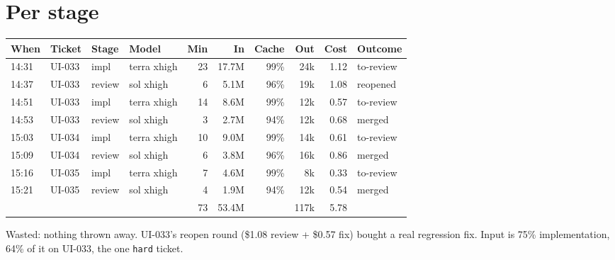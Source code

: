 \documentclass[11pt,a4paper]{article}
\begin{document}
\section*{Per stage}

{\small
\begin{tabularx}{\linewidth}{@{}llllrrrrrX@{}}
\toprule
When & Ticket & Stage & Model & Min & In & Cache & Out & Cost & Outcome \\
\midrule
14:31 & UI-033 & impl & terra xhigh & 23 & 17.7M & 99\% & 24k & 1.12 & to-review \\
14:37 & UI-033 & review & sol xhigh & 6 & 5.1M & 96\% & 19k & 1.08 & reopened \\
14:51 & UI-033 & impl & terra xhigh & 14 & 8.6M & 99\% & 12k & 0.57 & to-review \\
14:53 & UI-033 & review & sol xhigh & 3 & 2.7M & 94\% & 12k & 0.68 & merged \\
15:03 & UI-034 & impl & terra xhigh & 10 & 9.0M & 99\% & 14k & 0.61 & to-review \\
15:09 & UI-034 & review & sol xhigh & 6 & 3.8M & 96\% & 16k & 0.86 & merged \\
15:16 & UI-035 & impl & terra xhigh & 7 & 4.6M & 99\% & 8k & 0.33 & to-review \\
15:21 & UI-035 & review & sol xhigh & 4 & 1.9M & 94\% & 12k & 0.54 & merged \\
\midrule
 & & & & 73 & 53.4M & & 117k & 5.78 & \\
\bottomrule
\end{tabularx}
}

\begin{center}
\end{center}

Wasted: nothing thrown away. UI-033's reopen round (\$1.08 review + \$0.57 fix) bought a real
regression fix. Input is 75\% implementation, 64\% of it on UI-033, the one \texttt{hard} ticket.
\end{document}
